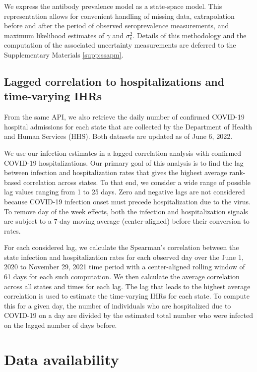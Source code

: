 \documentclass{article}
\begin{document}
We express the antibody prevalence model as a state-space model. This
representation allows for convenient handling of missing data, extrapolation
before and after the period of observed seroprevalence measurements, and maximum
likelihood estimates of $\gamma$ and $\sigma^2_\epsilon$. Details of this
methodology and the computation of the associated uncertainty measurements are
deferred to the Supplementary Materials \ref{supp:ssapm}.


\subsection{Lagged correlation to hospitalizations and time-varying IHRs} 

From the same API, we also retrieve the
daily number of confirmed COVID-19 hospital admissions for each state that are
collected by the \US Department of Health and Human Services (HHS). Both
datasets are updated as of June 6, 2022.

We use our infection estimates in a lagged correlation analysis with confirmed
COVID-19 hospitalizations. Our primary goal of this analysis is to find the lag
between infection and hospitalization rates that gives the highest average
rank-based correlation across \US states. To that end, we consider a wide range
of possible lag values ranging from 1 to 25 days. Zero and negative lags are not
considered because COVID-19 infection onset must precede hospitalization due to
the virus. To remove day of the week effects, both the infection and
hospitalization signals are subject to a 7-day moving average (center-aligned)
before their conversion to rates.

For each considered lag, we calculate the Spearman's correlation between the 
state infection and hospitalization rates for each observed day 
over the June 1, 2020 to November 29, 2021
time period %
with a center-aligned rolling window of 61 days for each such computation.
We then calculate the average correlation across all states and times for each lag. 
The lag that leads to the highest average correlation is used to estimate 
the time-varying IHRs for each
state. To compute this for a given day, the number of individuals who are
hospitalized due to COVID-19 on a day are divided by the estimated total number
who were infected on the lagged number of days before.


\section*{Data availability}
\end{document}
